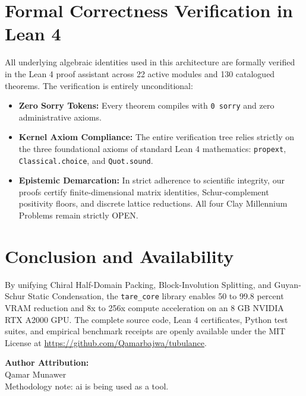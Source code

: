 \documentclass[11pt,a4paper]{article}
\begin{document}
\section{Formal Correctness Verification in Lean 4}
All underlying algebraic identities used in this architecture are formally verified in the Lean 4 proof assistant across 22 active modules and 130 catalogued theorems. The verification is entirely unconditional:
\begin{itemize}
    \item \textbf{Zero Sorry Tokens:} Every theorem compiles with \texttt{0 sorry} and zero administrative axioms.
    \item \textbf{Kernel Axiom Compliance:} The entire verification tree relies strictly on the three foundational axioms of standard Lean 4 mathematics: \texttt{propext}, \texttt{Classical.choice}, and \texttt{Quot.sound}.
    \item \textbf{Epistemic Demarcation:} In strict adherence to scientific integrity, our proofs certify finite-dimensional matrix identities, Schur-complement positivity floors, and discrete lattice reductions. All four Clay Millennium Problems remain strictly OPEN.
\end{itemize}

\section*{Conclusion and Availability}
By unifying Chiral Half-Domain Packing, Block-Involution Splitting, and Guyan-Schur Static Condensation, the \texttt{tare\_core} library enables 50 to 99.8 percent VRAM reduction and 8x to 256x compute acceleration on an 8 GB NVIDIA RTX A2000 GPU. The complete source code, Lean 4 certificates, Python test suites, and empirical benchmark receipts are openly available under the MIT License at \url{https://github.com/Qamarbajwa/tubulance}.

\vspace{1.5em}
\noindent\textbf{Author Attribution:}\\
Qamar Munawer\\
Methodology note: ai is being used as a tool.
\end{document}

